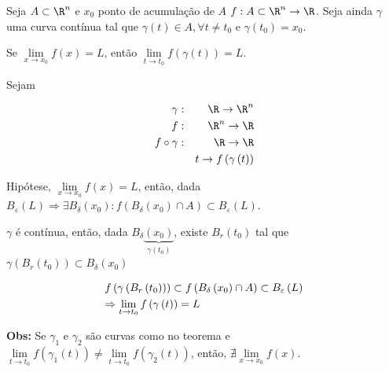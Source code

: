 \documentclass[11pt, oneside, a4paper]{gsm-l}
\begin{document}
\begin{teo}
    Seja $A \subset \R^n$ e $x_0$ ponto de acumulação de $A$ $f:A \subset \R^n  \to \R$. Seja ainda $\gamma$ uma curva contínua tal que $\gamma \left( t \right) \in A,\forall t \ne t_0$ e $\gamma \left( {t_0 } \right) = x_0$.

    Se $\mathop {\lim }\limits_{x \to x_0 } f\left( x \right) = L$, então $\mathop {\lim }\limits_{t \to t_0 } f\left( {\gamma \left( t \right)} \right) = L$.
\end{teo}

\begin{dem}
Sejam

\begin{eqnarray*}
\gamma &:&\R \to \R^n  \hfill \\
f&:&\R^n  \to \R \hfill \\
f \circ \gamma &:&\R \to \R \hfill \\
&& t \to f\left( {\gamma \left( t \right)} \right) \hfill \\
\end{eqnarray*}

    Hip\'otese, $\mathop {\lim }\limits_{x \to x_0 } f\left( x \right) = L$, então, dada $B_\varepsilon  \left( L \right) \Rightarrow \exists B_\delta  \left( {x_0 } \right):f\left( {B_\delta  \left( {x_0 } \right) \cap A} \right) \subset B_\varepsilon  \left( L \right)$.


    $\gamma$ é contínua, então, dada $B_\delta  \underbrace {\left( {x_0 } \right)}_{\gamma \left( {t_0 } \right)}$, existe $B_r \left( {t_0 } \right)$ tal que $\gamma \left( {B_r \left( {t_0 } \right)} \right) \subset B_\delta  \left( {x_0 } \right)$

\[
\begin{gathered}
  f\left( {\gamma \left( {B_r \left( {t_0 } \right)} \right)} \right) \subset f\left( {B_\delta  \left( {x_0 } \right) \cap A} \right) \subset B_\varepsilon  \left( L \right) \hfill \\
   \Rightarrow \mathop {\lim }\limits_{t \to t_0 } f\left( {\gamma \left( t \right)} \right) = L \hfill \\
\end{gathered}
\]

\end{dem}

\textbf{Obs:} Se $\gamma_1$ e $\gamma_2$ são curvas como no teorema e $\mathop {\lim }\limits_{t \to t_0 } f\left( {\gamma _1 \left( t \right)} \right) \ne \mathop {\lim }\limits_{t \to t_0 } f\left( {\gamma _2 \left( t \right)} \right)$, então, $\nexists \mathop {\lim }\limits_{x \to x_0 } f\left( x \right)$.
\end{document}
